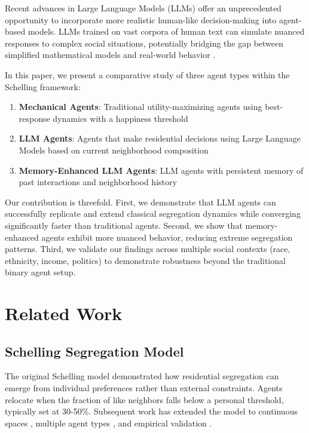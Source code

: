 \documentclass[pdflatex,sn-basic]{sn-jnl}%
\theoremstyle{thmstyleone}%
\theoremstyle{thmstyletwo}%
\theoremstyle{thmstylethree}%
\begin{document}
Recent advances in Large Language Models (LLMs) offer an unprecedented opportunity to incorporate more realistic human-like decision-making into agent-based models. LLMs trained on vast corpora of human text can simulate nuanced responses to complex social situations, potentially bridging the gap between simplified mathematical models and real-world behavior \cite{Park2023, Argyle2023}.

In this paper, we present a comparative study of three agent types within the Schelling framework:

\begin{enumerate}
\item \textbf{Mechanical Agents}: Traditional utility-maximizing agents using best-response dynamics with a happiness threshold
\item \textbf{LLM Agents}: Agents that make residential decisions using Large Language Models based on current neighborhood composition
\item \textbf{Memory-Enhanced LLM Agents}: LLM agents with persistent memory of past interactions and neighborhood history
\end{enumerate}

Our contribution is threefold. First, we demonstrate that LLM agents can successfully replicate and extend classical segregation dynamics while converging significantly faster than traditional agents. Second, we show that memory-enhanced agents exhibit more nuanced behavior, reducing extreme segregation patterns. Third, we validate our findings across multiple social contexts (race, ethnicity, income, politics) to demonstrate robustness beyond the traditional binary agent setup.

\section{Related Work}\label{sec:related}

\subsection{Schelling Segregation Model}

The original Schelling model \cite{Schelling1971} demonstrated how residential segregation can emerge from individual preferences rather than external constraints. Agents relocate when the fraction of like neighbors falls below a personal threshold, typically set at 30-50\%. Subsequent work has extended the model to continuous spaces \cite{Fossett2006}, multiple agent types \cite{Zhang2004}, and empirical validation \cite{Bruch2006}.
\end{document}
